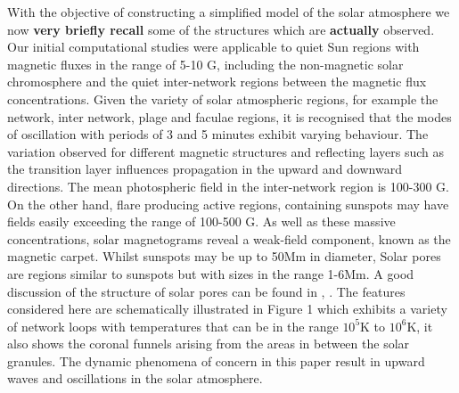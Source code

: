\documentclass[physics,article,submit,pdftex,moreauthors]{Definitions/mdpi}
\begin{document}
%
With the objective of constructing a simplified model of the solar atmosphere we now {\bf very briefly recall} some of the structures which are {\bf actually} observed. Our initial computational studies were applicable to quiet Sun regions with magnetic fluxes in the range of 5-10 G, including the non-magnetic solar chromosphere and the quiet inter-network regions between the magnetic flux concentrations. Given the variety of solar atmospheric regions, for example the network, inter network, plage and faculae regions, it is recognised that the modes of oscillation with periods of 3 and 5 minutes exhibit varying behaviour. The variation observed for different magnetic structures and reflecting layers such as the transition layer influences propagation in the upward and downward directions. The mean photospheric field in the inter-network region is 100-300 G. 
 On the other hand, flare producing active regions, containing sunspots may have fields easily  exceeding the %
range of 100-500 G. As well as these massive concentrations, solar magnetograms reveal 
 a weak-field component, known as the magnetic carpet. Whilst sunspots may be up to 50Mm in diameter, Solar pores are regions similar to sunspots but with sizes in the range 1-6Mm. A good discussion of the structure of  solar pores can be found in \cite{Simon1970}, \cite{Cameron2007}. The features considered here are  schematically illustrated in Figure 1 which exhibits a  variety of network loops with temperatures  that  can be in the range $10^{5}$K to $10^{6}$K, it also shows the coronal funnels arising from the areas in between the solar granules. The  dynamic phenomena of concern in this paper result in  upward waves and oscillations in the solar atmosphere. 
\end{document}

